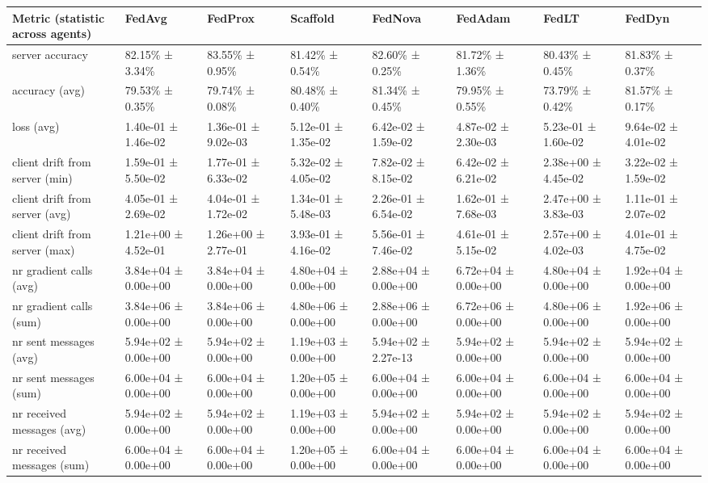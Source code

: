 \begin{tabular}{llllllll}
\hline
 Metric (statistic across agents)   & FedAvg              & FedProx             & Scaffold            & FedNova             & FedAdam             & FedLT               & FedDyn              \\
\hline
 server accuracy                    & 82.15\% ± 3.34\%      & 83.55\% ± 0.95\%      & 81.42\% ± 0.54\%      & 82.60\% ± 0.25\%      & 81.72\% ± 1.36\%      & 80.43\% ± 0.45\%      & 81.83\% ± 0.37\%      \\
 accuracy (avg)                     & 79.53\% ± 0.35\%      & 79.74\% ± 0.08\%      & 80.48\% ± 0.40\%      & 81.34\% ± 0.45\%      & 79.95\% ± 0.55\%      & 73.79\% ± 0.42\%      & 81.57\% ± 0.17\%      \\
 loss (avg)                         & 1.40e-01 ± 1.46e-02 & 1.36e-01 ± 9.02e-03 & 5.12e-01 ± 1.35e-02 & 6.42e-02 ± 1.59e-02 & 4.87e-02 ± 2.30e-03 & 5.23e-01 ± 1.60e-02 & 9.64e-02 ± 4.01e-02 \\
 client drift from server (min)     & 1.59e-01 ± 5.50e-02 & 1.77e-01 ± 6.33e-02 & 5.32e-02 ± 4.05e-02 & 7.82e-02 ± 8.15e-02 & 6.42e-02 ± 6.21e-02 & 2.38e+00 ± 4.45e-02 & 3.22e-02 ± 1.59e-02 \\
 client drift from server (avg)     & 4.05e-01 ± 2.69e-02 & 4.04e-01 ± 1.72e-02 & 1.34e-01 ± 5.48e-03 & 2.26e-01 ± 6.54e-02 & 1.62e-01 ± 7.68e-03 & 2.47e+00 ± 3.83e-03 & 1.11e-01 ± 2.07e-02 \\
 client drift from server (max)     & 1.21e+00 ± 4.52e-01 & 1.26e+00 ± 2.77e-01 & 3.93e-01 ± 4.16e-02 & 5.56e-01 ± 7.46e-02 & 4.61e-01 ± 5.15e-02 & 2.57e+00 ± 4.02e-03 & 4.01e-01 ± 4.75e-02 \\
 nr gradient calls (avg)            & 3.84e+04 ± 0.00e+00 & 3.84e+04 ± 0.00e+00 & 4.80e+04 ± 0.00e+00 & 2.88e+04 ± 0.00e+00 & 6.72e+04 ± 0.00e+00 & 4.80e+04 ± 0.00e+00 & 1.92e+04 ± 0.00e+00 \\
 nr gradient calls (sum)            & 3.84e+06 ± 0.00e+00 & 3.84e+06 ± 0.00e+00 & 4.80e+06 ± 0.00e+00 & 2.88e+06 ± 0.00e+00 & 6.72e+06 ± 0.00e+00 & 4.80e+06 ± 0.00e+00 & 1.92e+06 ± 0.00e+00 \\
 nr sent messages (avg)             & 5.94e+02 ± 0.00e+00 & 5.94e+02 ± 0.00e+00 & 1.19e+03 ± 0.00e+00 & 5.94e+02 ± 2.27e-13 & 5.94e+02 ± 0.00e+00 & 5.94e+02 ± 0.00e+00 & 5.94e+02 ± 0.00e+00 \\
 nr sent messages (sum)             & 6.00e+04 ± 0.00e+00 & 6.00e+04 ± 0.00e+00 & 1.20e+05 ± 0.00e+00 & 6.00e+04 ± 0.00e+00 & 6.00e+04 ± 0.00e+00 & 6.00e+04 ± 0.00e+00 & 6.00e+04 ± 0.00e+00 \\
 nr received messages (avg)         & 5.94e+02 ± 0.00e+00 & 5.94e+02 ± 0.00e+00 & 1.19e+03 ± 0.00e+00 & 5.94e+02 ± 0.00e+00 & 5.94e+02 ± 0.00e+00 & 5.94e+02 ± 0.00e+00 & 5.94e+02 ± 0.00e+00 \\
 nr received messages (sum)         & 6.00e+04 ± 0.00e+00 & 6.00e+04 ± 0.00e+00 & 1.20e+05 ± 0.00e+00 & 6.00e+04 ± 0.00e+00 & 6.00e+04 ± 0.00e+00 & 6.00e+04 ± 0.00e+00 & 6.00e+04 ± 0.00e+00 \\
\hline
\end{tabular}